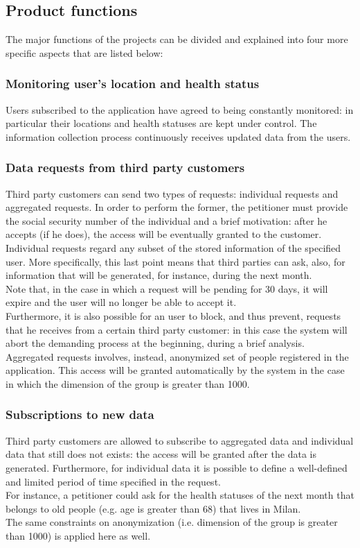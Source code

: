 \subsection{Product functions}
The major functions of the projects can be divided and explained into four more specific aspects that are listed below: 

\subsubsection{Monitoring user's location and health status}
Users subscribed to the application have agreed to being constantly monitored: in particular their locations and health statuses are kept under control. 
The information collection process continuously receives updated data from the users.\\

\subsubsection{Data requests from third party customers}
Third party customers can send two types of requests: individual requests and aggregated requests. 
In order to perform the former, the petitioner must provide the social security number of the individual and a brief motivation: after he accepts (if he does), the access will be eventually granted to the customer.
Individual requests regard any subset of the stored information of the specified user.
More specifically, this last point means that third parties can ask, also, for information that will be generated, for instance, during the next month. \\
Note that, in the case in which a request will be pending for 30 days, it will expire and the user will no longer be able to accept it. \\
Furthermore, it is also possible for an user to block, and thus prevent, requests that he receives from a certain third party customer: in this case the system will abort the demanding process at the beginning, during a brief analysis.\\
Aggregated requests involves, instead, anonymized set of people registered in the application. 
This access will be granted automatically by the system in the case in which the dimension of the group is greater than 1000.   

\subsubsection{Subscriptions to new data}
Third party customers are allowed to subscribe to aggregated data and individual data that still does not exists: the access will be granted after the data is generated.
Furthermore, for individual data it is possible to define a well-defined and limited period of time specified in the request.\\
For instance, a petitioner could ask for the health statuses of the next month that belongs to old people (e.g. age is greater than 68) that lives in Milan. \\
The same constraints on anonymization (i.e. dimension of the group is greater than 1000) is applied here as well.

